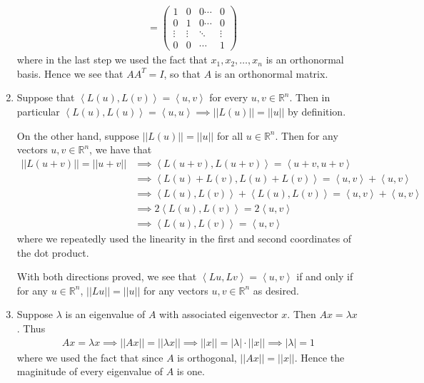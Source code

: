 \documentclass[12pt,letterpaper,boxed]{math_hw_pset}
\newcommand{\rr}{\mathbb{R}}
\newcommand{\<}{\left<}
\renewcommand{\>}{\right>}
\begin{document}
\begin{solution}
\begin{enumerate}
\begin{align*}
            &= 
            \begin{pmatrix}
                1 & 0 & 0 \cdots & 0\\
                0 & 1 & 0 \cdots & 0\\
                \vdots & \vdots & \ddots & \vdots\\
                0 & 0 & \cdots & 1
            \end{pmatrix}
        \end{align*}
        where in the last step we used the fact that $x_1, x_2, \dots, x_n$ is an orthonormal 
        basis. Hence we see that $AA^T = I$, so that $A$ is an orthonormal matrix. 

        \item Suppose that $\<L(u), L(v)\> = \<u, v\>$ for every $u,v \in \rr^n$. Then 
        in particular $\<L(u) , L(u)\> = \<u, u\> \implies ||L(u)|| = ||u||$ by definition. 

        On the other hand, suppose $||L(u)|| = ||u||$ for all $u \in \rr^n$. Then 
        for any vectors $u, v \in \rr^n$, we have that 
        \begin{align*}
            ||L(u + v)|| = ||u + v|| &\implies \<L(u + v), L(u + v)\>  = \<u + v, u + v\>\\
            &\implies \<L(u) + L(v), L(u) + L(v)\> = \<u, v\> + \<u, v\>\\
            &\implies \<L(u), L(v)\> + \<L(u), L(v)\> = \<u, v\> + \<u, v\>\\
            &\implies 2\<L(u), L(v)\> = 2\<u, v\>\\
            &\implies \<L(u), L(v)\> = \<u, v\>
        \end{align*}
        where we repeatedly used the linearity in the first and second coordinates 
        of the dot product. 

        With both directions proved, we see that $\left< Lu, Lv\right> =  \left<u,v \right>$
        if and only if for any $u \in \rr^n$, $||Lu||= ||u||$ for any vectors $u,v \in \rr^n$ as desired. 

        \item Suppose $\lambda$ is an eigenvalue of $A$ with associated eigenvector $x$. Then 
        $Ax = \lambda x$. Thus 
        \begin{align*}
            Ax = \lambda x \implies ||Ax|| = ||\lambda x|| \implies ||x|| = |\lambda|\cdot||x|| \implies |\lambda| =1
        \end{align*}
        where we used  the fact that since $A$ is orthogonal, $||Ax|| = ||x||$. Hence 
        the maginitude of every eigenvalue of $A$ is one. 
    \end{enumerate}
\end{solution}
\end{document}
